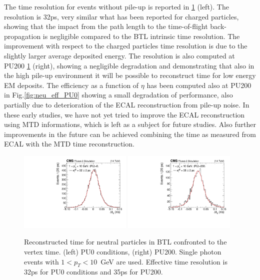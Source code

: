 The time resolution for events without pile-up is reported in \ref{fig:neu_tres} (left). The resolution is 32ps, very similar what has been reported for charged particles, showing that the impact from the path length to the time-of-flight back-propagation is negligible compared to the BTL intrinsic time resolution. The improvement with respect to the charged particles time resolution is due to the slightly larger average deposited energy. The resolution is also computed at PU200 \ref{fig:neu_tres} (right), showing a negligible degradation and demonstrating that also in the high pile-up environment it will be possible to reconstruct time for low energy EM deposits. The efficiency as a function of $\eta$ has been computed also at PU200 in Fig.\ref{fig:neu_eff_PU0} showing a small degradation of performance, also partially due to deterioration of the ECAL reconstruction from pile-up noise. In these early studies, we have not yet tried to improve the ECAL reconstruction using MTD informations, which is left as a subject for future studies. Also further improvements in the future can be achieved combining the time as measured from ECAL with the MTD time reconstruction.

\begin{figure}[!hbtp]
\centering
\includegraphics[width=0.48\textwidth]{fig/performance/neutrals/t0_resolution_simhtof_0PU.pdf}
\includegraphics[width=0.48\textwidth]{fig/performance/neutrals/t0_resolution_simhtof_200PU.pdf}
\caption{Reconstructed time for neutral particles in BTL confronted to the vertex time. (left) PU0 conditions, (right) PU200. Single photon events with $1<p_{T}<10$~GeV are used. Effective time resolution is 32ps for PU0 conditions and 35ps for PU200.}
\label{fig:neu_tres}
\end{figure}
